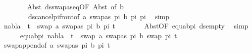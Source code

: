 \begin{isabellebody}
\ \ \ \ \ \ \isamarkupfalse%
\ Abst{\isacharparenleft}{\kern0pt}{}{\isacharparenright}{\kern0pt}\ ds{\isacharunderscore}{\kern0pt}swapas{\isacharunderscore}{\kern0pt}eq{\isacharbrackleft}{\kern0pt}OF\ Abst{\isacharparenleft}{\kern0pt}{}{\isacharparenright}{\kern0pt}{\isacharcomma}{\kern0pt}\ of\ b{\isacharbrackright}{\kern0pt}\ \isanewline
\ \ \ \ \ \ \ \ ds{\isacharunderscore}{\kern0pt}cancel{\isacharunderscore}{\kern0pt}pi{\isacharunderscore}{\kern0pt}front{\isacharbrackleft}{\kern0pt}of\ {\isacartoucheopen}{\isacharbrackleft}{\kern0pt}{\isacharparenleft}{\kern0pt}a{\isacharcomma}{\kern0pt}\ swapas\ pi{}\ b{\isacharparenright}{\kern0pt}{\isacharbrackright}{\kern0pt}{\isacartoucheclose}\ pi{}\ pi{}{\isacharbrackright}{\kern0pt}\ \isamarkupfalse%
\ simp\isanewline
\ \ \ \ \isanewline
\ \ \ \ \isamarkupfalse%
\ {\isachardoublequoteopen}nabla\ {\isasymturnstile}\ t{}{\isacharprime}{\kern0pt}\ {\isasymapprox}\ swap\ {\isacharparenleft}{\kern0pt}{\isacharbrackleft}{\kern0pt}{\isacharparenleft}{\kern0pt}a{\isacharcomma}{\kern0pt}\ swapas\ pi{}\ b{\isacharparenright}{\kern0pt}{\isacharbrackright}{\kern0pt}{\isacharat}{\kern0pt}\ pi{}{\isacharparenright}{\kern0pt}\ t{}{\isacharprime}{\kern0pt}{\isachardoublequoteclose}\isanewline
\ \ \ \ \ \ \isamarkupfalse%
\ Abst{\isacharparenleft}{\kern0pt}{}{\isacharparenright}{\kern0pt}{\isacharbrackleft}{\kern0pt}OF\ equ{\isacharunderscore}{\kern0pt}ab{\isacharunderscore}{\kern0pt}pi{}\ ds{\isacharunderscore}{\kern0pt}empty{\isacharbrackright}{\kern0pt}\ \isamarkupfalse%
\ simp\isanewline
\ \ \ \ \isamarkupfalse%
\ equ{\isacharunderscore}{\kern0pt}ab{\isacharunderscore}{\kern0pt}pi{}{\isacharcolon}{\kern0pt}\ {\isachardoublequoteopen}nabla\ {\isasymturnstile}\ t{}{\isacharprime}{\kern0pt}\ {\isasymapprox}\ swap\ {\isacharbrackleft}{\kern0pt}{\isacharparenleft}{\kern0pt}a{\isacharcomma}{\kern0pt}\ swapas\ pi{}\ b{\isacharparenright}{\kern0pt}{\isacharbrackright}{\kern0pt}\ {\isacharparenleft}{\kern0pt}swap\ pi{}\ t{}{\isacharprime}{\kern0pt}{\isacharparenright}{\kern0pt}{\isachardoublequoteclose}\isanewline
\ \ \ \ \ \ \isamarkupfalse%
\ swap{\isacharunderscore}{\kern0pt}append{\isacharbrackleft}{\kern0pt}of\ {\isacartoucheopen}{\isacharbrackleft}{\kern0pt}{\isacharparenleft}{\kern0pt}a{\isacharcomma}{\kern0pt}\ swapas\ pi{}\ b{\isacharparenright}{\kern0pt}{\isacharbrackright}{\kern0pt}{\isacartoucheclose}\ pi{}\ t{}{\isacharprime}{\kern0pt}{\isacharbrackright}{\kern0pt}\ \isamarkupfalse%

\end{isabellebody}
